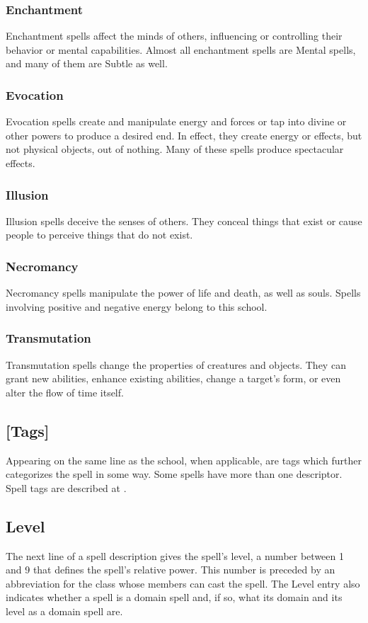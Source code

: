\subsubsection{Enchantment}
Enchantment spells affect the minds of others, influencing or controlling their behavior or mental capabilities. Almost all enchantment spells are Mental spells, and many of them are Subtle as well.

\subsubsection{Evocation}
Evocation spells create and manipulate energy and forces or tap into divine or other powers to produce a desired end. In effect, they create energy or effects, but not physical objects, out of nothing. Many of these spells produce spectacular effects.

\subsubsection{Illusion}
Illusion spells deceive the senses of others. They conceal things that exist or cause people to perceive things that do not exist.

\subsubsection{Necromancy}
Necromancy spells manipulate the power of life and death, as well as souls. Spells involving positive and negative energy belong to this school.

\subsubsection{Transmutation}
Transmutation spells change the properties of creatures and objects. They can grant new abilities, enhance existing abilities, change a target's form, or even alter the flow of time itself.

\subsection{[Tags]}
Appearing on the same line as the school, when applicable, are tags which further categorizes the spell in some way. Some spells have more than one descriptor. Spell tags are described at .

\subsection{Level}
The next line of a spell description gives the spell's level, a number between 1 and 9 that defines the spell's relative power. This number is preceded by an abbreviation for the class whose members can cast the spell. The Level entry also indicates whether a spell is a domain spell and, if so, what its domain and its level as a domain spell are.

